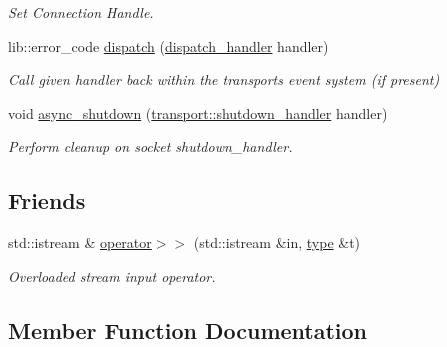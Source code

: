 \begin{DoxyCompactItemize}
\begin{DoxyCompactList}\small\item\em Set Connection Handle. \end{DoxyCompactList}\item 
lib\+::error\+\_\+code \mbox{\hyperlink{classwebsocketpp_1_1transport_1_1iostream_1_1connection_a0c31a1546701021f547ae2f21126a473}{dispatch}} (\mbox{\hyperlink{namespacewebsocketpp_1_1transport_a6658447b2e10f4c712dd792aad0e0c78}{dispatch\+\_\+handler}} handler)
\begin{DoxyCompactList}\small\item\em Call given handler back within the transport\textquotesingle{}s event system (if present) \end{DoxyCompactList}\item 
void \mbox{\hyperlink{classwebsocketpp_1_1transport_1_1iostream_1_1connection_a2db617fadc96d53034eae1d0f3f1a68a}{async\+\_\+shutdown}} (\mbox{\hyperlink{namespacewebsocketpp_1_1transport_af39aff6fc4cb76f7df0d5322b734d156}{transport\+::shutdown\+\_\+handler}} handler)
\begin{DoxyCompactList}\small\item\em Perform cleanup on socket shutdown\+\_\+handler. \end{DoxyCompactList}\end{DoxyCompactItemize}
\subsection*{Friends}
\begin{DoxyCompactItemize}
\item 
std\+::istream \& \mbox{\hyperlink{classwebsocketpp_1_1transport_1_1iostream_1_1connection_abe774d57c24627dd991932f833041987}{operator$>$$>$}} (std\+::istream \&in, \mbox{\hyperlink{classwebsocketpp_1_1transport_1_1iostream_1_1connection_a39c8ef910236a223be66a8338962cb99}{type}} \&t)
\begin{DoxyCompactList}\small\item\em Overloaded stream input operator. \end{DoxyCompactList}\end{DoxyCompactItemize}


\subsection{Member Function Documentation}
\mbox{\label{classwebsocketpp_1_1transport_1_1iostream_1_1connection_ad66fa146a7cdc19bfca3e32da23b9c60}} 
